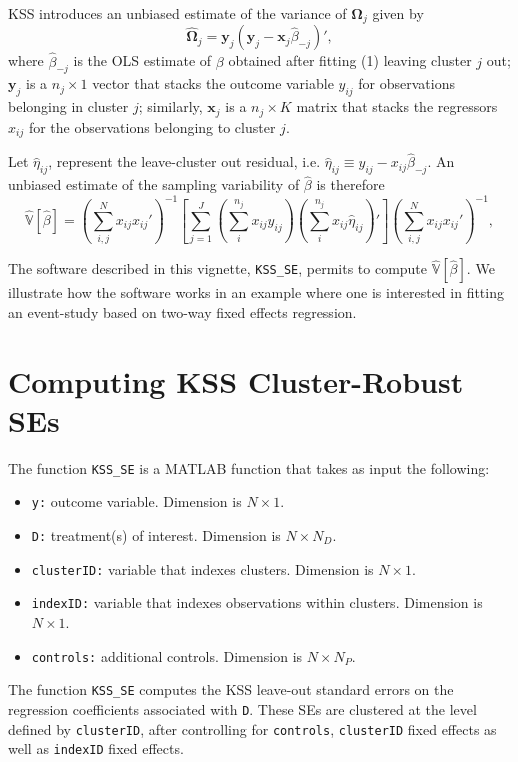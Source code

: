 \documentclass[11pt]{article}
\begin{document}
KSS introduces an unbiased estimate of the variance of $\mathbf{\Omega}_{j}$ given by 
\begin{equation}
    \hat{\mathbf{\Omega}}_{j}=\mathbf{y}_{j}(\mathbf{y}_{j}-\mathbf{x}_{j}\hat{\beta}_{-j})',
\end{equation}
where $\hat{\beta}_{-j}$ is the OLS estimate of $\beta$ obtained after fitting (1) leaving cluster $j$ out; $\mathbf{y}_{j}$ is a $n_{j}\times1$ vector that stacks the outcome variable $y_{ij}$ for observations belonging in cluster $j$; similarly, $\mathbf{x}_{j}$ is a $n_{j}\times K$ matrix that stacks the regressors $x_{ij}$ for the observations belonging to cluster $j$. 

Let $\hat{\eta}_{ij}$, represent the leave-cluster out residual, i.e. $\hat{\eta}_{ij} \equiv y_{ij}-x_{ij}\hat{\beta}_{-j}$. An unbiased estimate of the sampling variability of $\hat{\beta}$ is therefore
\begin{equation}
{\mathbb{{\hat{V}}}}[\hat{\beta}]=\left(\sum_{i,j}^{N}x_{ij}x_{ij}'\right)^{-1}\left[\sum_{j=1}^J\left(\sum_{i}^{n_{j}}x_{ij}y_{ij}\right)\left(\sum_{i}^{n_{j}}x_{ij}\hat{\eta}_{ij}\right)'\right]\left(\sum_{i,j}^{N}x_{ij}x_{ij}'\right)^{-1},
\end{equation}
  
The software described in this vignette, \texttt{KSS\_SE}, permits to compute ${\mathbb{{\hat{V}}}}[\hat{\beta}]$. We illustrate how the software works in an example where one is interested in fitting an event-study based on two-way fixed effects regression. 

\newpage
\hypertarget{computing-the-kss-correction}{%
\section{Computing KSS Cluster-Robust SEs}
\label{computing-the-kss-correction}}

The function \texttt{KSS\_SE} is a MATLAB function that takes as input the following:
\begin{itemize}
\item \texttt{y:} outcome variable. Dimension is $N\times 1$.
\item \texttt{D:} treatment(s) of interest. Dimension is $N\times N_{D}$.
\item \texttt{clusterID:} variable that indexes clusters. Dimension is $N\times 1$.
\item \texttt{indexID:} variable that indexes observations within clusters. Dimension is $N\times 1$.
\item \texttt{controls:} additional controls. Dimension is $N\times N_{P}$.
\end{itemize}
The function \texttt{KSS\_SE} computes the KSS leave-out standard errors on the regression coefficients associated with \texttt{D}. These SEs are clustered at the level defined by \texttt{clusterID}, after controlling for \texttt{controls}, \texttt{clusterID} fixed effects as well as \texttt{indexID} fixed effects. 
\end{document}

